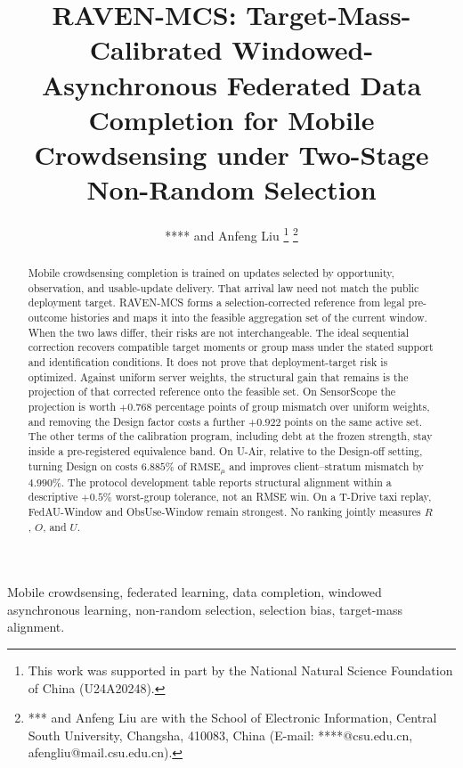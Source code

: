 \documentclass[letterpaper,journal]{IEEEtran}
\begin{document}
\title{RAVEN-MCS: Target-Mass-Calibrated Windowed-Asynchronous Federated Data Completion for Mobile Crowdsensing under Two-Stage Non-Random Selection}

\author{**** and Anfeng Liu%
\thanks{This work was supported in part by the National Natural Science Foundation of China (U24A20248).}%
\thanks{*** and Anfeng Liu are with the School of Electronic Information, Central South University, Changsha, 410083, China (E-mail: ****@csu.edu.cn, afengliu@mail.csu.edu.cn).}%
}


\maketitle


\begin{abstract}
Mobile crowdsensing completion is trained on updates selected by opportunity,
observation, and usable-update delivery.  That arrival law need not match the
public deployment target.  RAVEN-MCS forms a selection-corrected reference from
legal pre-outcome histories and maps it into the feasible aggregation set of the
current window.  When the two laws differ, their risks are not interchangeable.
The ideal sequential correction recovers compatible target moments or group mass
under the stated support and identification conditions.  It does not prove that
deployment-target risk is optimized.  Against uniform server weights, the
structural gain that remains is the projection of that corrected reference onto
the feasible set.  On SensorScope the projection is worth $+0.768$ percentage
points of group mismatch over uniform weights, and removing the Design factor
costs a further $+0.922$ points on the same active set.  The other terms of the
calibration program, including debt at the frozen strength, stay inside a
pre-registered equivalence band.  On U-Air, relative to the Design-off setting,
turning Design on costs $6.885\%$ of $\mathrm{RMSE}_{\mu}$ and improves
client--stratum mismatch by $4.990\%$.  The protocol development table reports
structural alignment within a descriptive $+0.5\%$ worst-group tolerance, not an
RMSE win.  On a T-Drive taxi replay, FedAU-Window and ObsUse-Window remain
strongest.  No ranking jointly measures $R$, $O$, and $U$.
\end{abstract}

\begin{IEEEkeywords}
Mobile crowdsensing, federated learning, data completion, windowed asynchronous learning, non-random selection, selection bias, target-mass alignment.
\end{IEEEkeywords}
\end{document}
